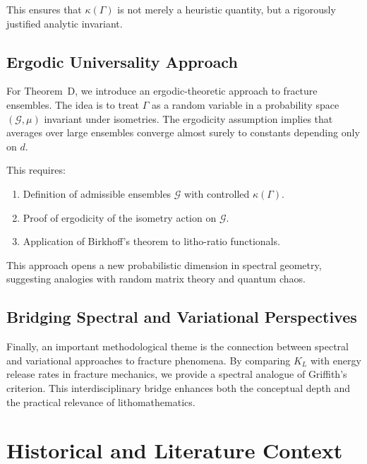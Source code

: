 This ensures that $\kappa(\Gamma)$ is not merely a heuristic quantity, but a 
rigorously justified analytic invariant.

\subsection{Ergodic Universality Approach}

For Theorem~D, we introduce an ergodic-theoretic approach to fracture 
ensembles. The idea is to treat $\Gamma$ as a random variable in a probability 
space $(\mathcal G,\mu)$ invariant under isometries. The ergodicity assumption 
implies that averages over large ensembles converge almost surely to constants 
depending only on $d$. 

This requires:
\begin{enumerate}
  \item Definition of admissible ensembles $\mathcal G$ with controlled 
  $\kappa(\Gamma)$.
  \item Proof of ergodicity of the isometry action on $\mathcal G$.
  \item Application of Birkhoff’s theorem to litho-ratio functionals.
\end{enumerate}

This approach opens a new probabilistic dimension in spectral geometry, 
suggesting analogies with random matrix theory and quantum chaos.

\subsection{Bridging Spectral and Variational Perspectives}

Finally, an important methodological theme is the connection between spectral 
and variational approaches to fracture phenomena. By comparing $K_L$ with 
energy release rates in fracture mechanics, we provide a spectral analogue of 
Griffith’s criterion. This interdisciplinary bridge enhances both the 
conceptual depth and the practical relevance of lithomathematics.



\section{Historical and Literature Context}

